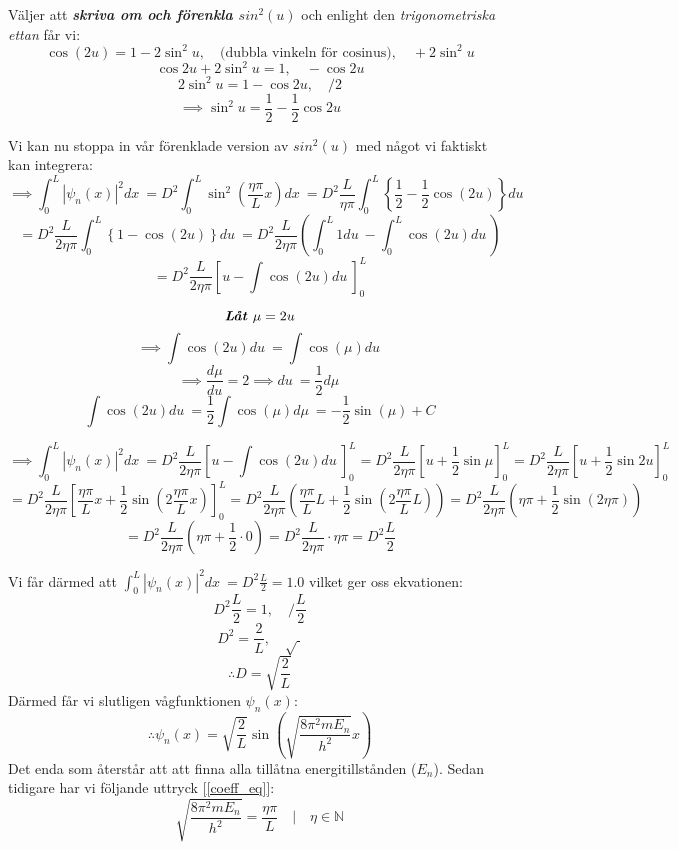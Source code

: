 \documentclass{article}
\newcommand{\shrodprob}{|\psi_n(x)|^2}
\begin{document}
Väljer att \emph{\textbf{skriva om och förenkla $sin^2(u)$}} och enlight den \emph{trigonometriska ettan} får vi:
$$
\cos(2u) = 1 - 2\sin^2 u, \quad \text{(dubbla vinkeln för cosinus)}, \quad +2\sin^2 u
$$
$$
\cos 2u + 2\sin^2 u = 1, \quad -\cos 2u
$$
$$
2\sin^2 u = 1 - \cos 2u, \quad /2
$$
$$
\implies \sin^2 u = \frac{1}{2} - \frac{1}{2}\cos 2u
$$

Vi kan nu stoppa in vår förenklade version av $sin^2(u)$ med något vi faktiskt kan integrera:
$$
\implies \int_0^L \shrodprob dx\ 
= D^2 \int_0^L \sin^2\left( \frac{\eta\pi}{L} x \right) dx\ 
= D^2 \frac{L}{\eta\pi} \int_0^L \left\{ \frac{1}{2} - \frac{1}{2}\cos(2u) \right\} du\ 
$$
$$
= D^2 \frac{L}{2\eta\pi} \int_0^L \left\{ 1 - \cos(2u) \right\} du\ 
= D^2 \frac{L}{2\eta\pi} \left( \int_0^L 1 du\ - \int_0^L \cos(2u) du\ \right)
$$
$$
= D^2 \frac{L}{2\eta\pi} \left[u - \int \cos(2u) du\ \right]_0^L
$$

$$
\emph{\textbf{Låt $\mu = 2u$}}
$$
$$
\implies \int \cos(2u) du\ = \int \cos(\mu) du\
$$
$$
\implies \frac{d\mu}{du} = 2 \implies du\ = \frac{1}{2} d\mu\
$$
$$
\int \cos(2u) du\ = \frac{1}{2} \int \cos(\mu) d\mu\ = -\frac{1}{2} \sin(\mu) + C
$$

$$
\implies \int_0^L \shrodprob dx\ 
= D^2 \frac{L}{2\eta\pi} \left[u - \int \cos(2u) du\ \right]_0^L
= D^2 \frac{L}{2\eta\pi} \left[ u + \frac{1}{2}\sin \mu \right]_0^L
= D^2 \frac{L}{2\eta\pi} \left[ u + \frac{1}{2}\sin 2u \right]_0^L
$$
$$
= D^2 \frac{L}{2\eta\pi} \left[ \frac{\eta\pi}{L}x + \frac{1}{2}\sin\left(2\frac{\eta\pi}{L}x\right) \right]_0^L
= D^2 \frac{L}{2\eta\pi} \left(\frac{\eta\pi}{L}L + \frac{1}{2}\sin\left(2\frac{\eta\pi}{L}L\right) \right)
= D^2 \frac{L}{2\eta\pi} \left(\eta\pi + \frac{1}{2}\sin\left(2\eta\pi\right) \right)
$$
$$
= D^2 \frac{L}{2\eta\pi} \left(\eta\pi + \frac{1}{2} \cdot 0 \right)
= D^2 \frac{L}{2\eta\pi} \cdot \eta\pi
= D^2 \frac{L}{2}
$$

Vi får därmed att $\int_0^L \shrodprob dx\ = D^2 \frac{L}{2} = 1.0$ vilket ger oss ekvationen:
$$
D^2 \frac{L}{2} = 1, \quad / \frac{L}{2}
$$
$$
D^2 = \frac{2}{L}, \quad \sqrt{\ }
$$
$$
\therefore D = \sqrt{ \frac{2}{L} }
$$
Därmed får vi slutligen vågfunktionen $\psi_n(x)$:
\begin{equation} \label{wavefun_part}
	\therefore \psi_n(x) = \sqrt{ \frac{2}{L} } \sin \left( \sqrt{\frac{8 \pi^2 m E_n}{h^2}} x \right)
\end{equation}
Det enda som återstår att att finna alla tillåtna energitillstånden ($E_n$). Sedan tidigare har vi följande uttryck [\ref{coeff_eq}]:
$$
\sqrt{\frac{8 \pi^2 m E_n}{h^2}} = \frac{\eta\pi}{L} \quad | \quad \eta \in \mathbb{N}
$$
\end{document}
